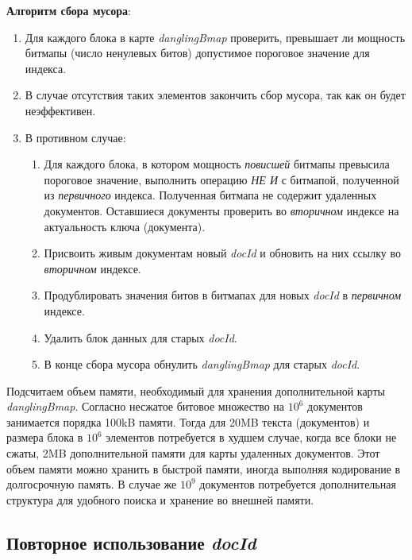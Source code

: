 \textbf{Алгоритм сбора мусора}:
\begin{enumerate}
    \item Для каждого блока в карте \textit{danglingBmap} проверить, превышает
    ли мощность битмапы (число ненулевых битов) допустимое пороговое значение
    для индекса.
    \item В случае отсутствия таких элементов закончить сбор мусора, так
    как он будет неэффективен.
    \item В противном случае: \begin{enumerate}
        \item Для каждого блока, в котором мощность \textit{повисшей} битмапы
        превысила пороговое значение, выполнить операцию \textit{НЕ И} с битмапой,
        полученной из \textit{первичного} индекса. Полученная битмапа не содержит
        удаленных документов. Оставшиеся документы проверить во \textit{вторичном}
        индексе на актуальность ключа (документа).
        \item Присвоить живым документам новый \textit{docId} и обновить
        на них ссылку во \textit{вторичном} индексе.
        \item Продублировать значения битов в битмапах для новых \textit{docId}
        в \textit{первичном} индексе.
        \item Удалить блок данных для старых \textit{docId}.
        \item В конце сбора мусора обнулить \textit{danglingBmap} для старых
        \textit{docId}.
    \end{enumerate}
\end{enumerate}

Подсчитаем объем памяти, необходимый для хранения дополнительной карты
\textit{danglingBmap}. Согласно \cite{Roaring:2019} несжатое битовое множество
на $10^6$ документов занимается порядка 100kB памяти. Тогда для 20MB текста
(документов) и размера блока в $10^6$ элементов потребуется в худшем случае,
когда все блоки не сжаты, 2MB дополнительной памяти для карты удаленных документов.
Этот объем памяти можно хранить в быстрой памяти, иногда выполняя кодирование
в долгосрочную память. В случае же $10^9$ документов потребуется дополнительная
структура для удобного поиска и хранение во внешней памяти.

\subsection{Повторное использование \textit{docId}}

